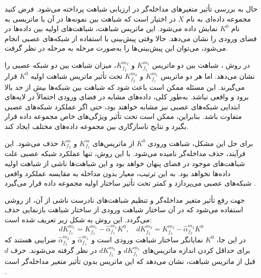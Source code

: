 
 حال به بررسی تأثیر متغیرهای مداخله‌گر%
 در ارزیابی شباهت پرداخته می‌شود.
 فرض کنید مجموعه داده‌ای به نام \(X\) در اختیار است که شباهت بین نمونه‌ها در آن با ماتریسی به نام
 \( K^0 \)
 نمایش داده می‌شود. این ماتریس شباهت، شباهت‌های اولیه بین داده‌ها در فضای ورودی را نشان می‌دهد. حالا وقتی پیش‌بینی با استفاده از شبکه‌های عصبی انجام می‌شود، می‌توان این پیش‌بینی‌ها را به‌صورت مرحله به مرحله در نظر گرفت.
 
 در روش
 ، شباهت بین دو ماتریس \(K_{f_1}^{m_1}\) و \(K_{f_2}^{m_2}\)، میزان شباهت بین دو شبکه عصبی را نشان می‌دهد. اما هر دو ماتریس \(K_{f_1}^{m_1}\) و \(K_{f_2}^{m_2}\) تحت تأثیر ماتریس شباهت اولیه
 \( K^0 \)
 قرار می‌گیرند. این مسئله ممکن است باعث شود که شباهت بین شبکه‌ها بیش از حد بالا برود و واقعی نباشد. به‌طور کلی، داده‌های مشابه در فضای ورودی احتمالاً در لایه‌های ابتدایی شبکه‌های عصبی نیز مشابه خواهند بود، حتی اگر عملکرد شبکه‌های عصبی متفاوت باشد. بنابراین،
 ممکن است تحت تأثیر ویژگی‌های خاص مجموعه داده قرار بگیرد و نتایج ناسازگاری بین مجموعه داده‌های مختلف ایجاد کند.
 
 برای حل این مشکل، شباهت ورودی \(K^0\) از ماتریس‌های \(K^{m}_{f_1}\) و \(K^{m}_{f_2}\) حذف می‌شود. این فرآیند، حذف مداخله‌گر نامیده می‌شود. با این روش، تنها عملکرد شبکه عصبی علت شباهت‌های موجود در فضای پنهان خواهد بود و این شباهت‌ها ناشی از شباهت اولیه داده‌ها نخواهد بود. به این ترتیب، معیار بدون مداخله به مقایسه عملکرد واقعی شبکه‌های عصبی می‌پردازد و کمتر تحت تأثیر ساختار اولیه مجموعه داده قرار می‌گیرد
 \cite{cui2022deconfounded}.
 
 
 جهت رفع تأثیر متغیر مداخله‌گر و تنظیم شباهت‌های نادرست ناشی از آن، از روشی استفاده می‌شود که در آن ساختار شباهت ورودی از ساختار شباهت بازنمایی حذف می‌گردد. این روش به شکل زیر تعریف شده است:
 \begin{equation}
 	dK^{m_1}_{f_1} = K^{m_1}_{f_1} - \hat{\alpha}^{m_1}_{f_1} K^0,  \quad
 	dK^{m_2}_{f_2} = K^{m_2}_{f_2} - \hat{\alpha}^{m_2}_{f_2} K^0
 \end{equation}
 در این جا، \(K^0\) نمایانگر ساختار شباهت ورودی است و \(\hat{\alpha}^{m_1}_{f_1}\) و \(\hat{\alpha}^{m_2}_{f_2}\) ضرایبی هستند که برای حداقل کردن اندازه‌ ماتریس‌های \(dK^{m_1}_{f_1}\) و \(dK^{m_2}_{f_2}\) در نظر گرفته می‌شوند. حرف \(d\) قبل از ماتریس شباهت، نشان می‌دهد که این ماتریس بدون تأثیر متغیر مداخله‌گر است
 \cite{cui2022deconfounded}.
 
